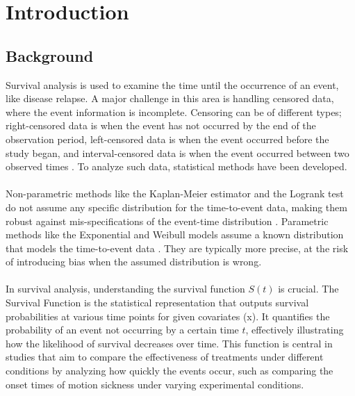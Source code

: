 \chapter{Introduction} %
\label{Chapter1} %

\section{Background}

\noindent Survival analysis is used to examine the time until the occurrence of an event, like disease relapse. A major challenge in this area is handling censored data, where the event information is incomplete. Censoring can be of different types; right-censored data is when the event has not occurred by the end of the observation period, left-censored data is when the event occurred before the study began, and interval-censored data is when the event occurred between two observed times \parencite{burzykowski_survival_2024}. To analyze such data, statistical methods have been developed.
\\\\
\noindent Non-parametric methods like the Kaplan-Meier estimator and the Logrank test do not assume any specific distribution for the time-to-event data, making them robust against mis-specifications of the event-time distribution \parencite{burzykowski_survival_2024}. Parametric methods like the Exponential and Weibull models assume a known distribution that models the time-to-event data \noindent \parencite{burzykowski_survival_2024}. They are typically more precise, at the risk of introducing bias when the assumed distribution is wrong.
\\\\
\noindent In survival analysis, understanding the survival function \( S(t)\) is crucial. The Survival Function is the statistical representation that outputs survival probabilities at various time points for given covariates (x). It quantifies the probability of an event not occurring by a certain time \(t\), effectively illustrating how the likelihood of survival decreases over time. This function is central in studies that aim to compare the effectiveness of treatments under different conditions by analyzing how quickly the events occur, such as comparing the onset times of motion sickness under varying experimental conditions.
\\\\
